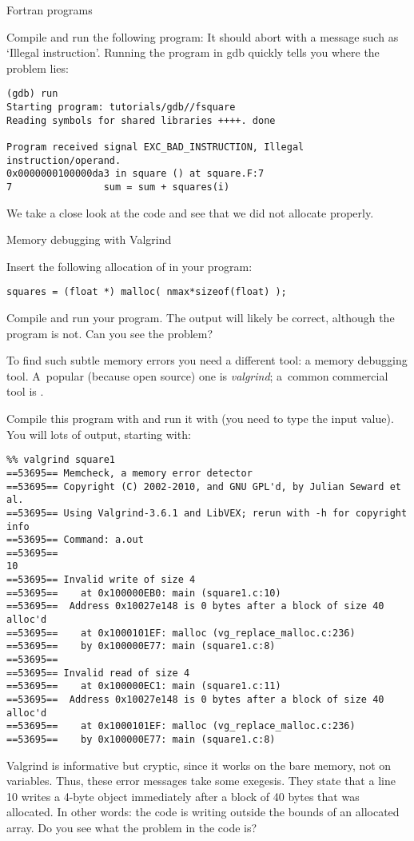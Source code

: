  {Fortran programs}

Compile and run the following program:
It should abort with a message such as `Illegal instruction'.
Running the program in gdb quickly tells you where the problem lies:
\begin{verbatim}
(gdb) run
Starting program: tutorials/gdb//fsquare 
Reading symbols for shared libraries ++++. done

Program received signal EXC_BAD_INSTRUCTION, Illegal instruction/operand.
0x0000000100000da3 in square () at square.F:7
7                sum = sum + squares(i)
\end{verbatim}
We take a close look at the code and see that we did not allocate
 properly.

 {Memory debugging with Valgrind}
\label{sec:valgrind}

Insert the following allocation of  in your program:
\begin{verbatim}
squares = (float *) malloc( nmax*sizeof(float) );
\end{verbatim}
Compile and run your program. The output will likely be correct,
although the program is not. Can you see the problem?


To find such subtle memory errors you need a different tool: a memory
debugging tool. A~popular (because open source) one is
\emph{valgrind}; a~common commercial tool is .

%
Compile this program with  and run it with
 (you need to type the input value). You will lots
of output, starting with:
{\small
\begin{verbatim}
%% valgrind square1
==53695== Memcheck, a memory error detector
==53695== Copyright (C) 2002-2010, and GNU GPL'd, by Julian Seward et al.
==53695== Using Valgrind-3.6.1 and LibVEX; rerun with -h for copyright info
==53695== Command: a.out
==53695== 
10
==53695== Invalid write of size 4
==53695==    at 0x100000EB0: main (square1.c:10)
==53695==  Address 0x10027e148 is 0 bytes after a block of size 40 alloc'd
==53695==    at 0x1000101EF: malloc (vg_replace_malloc.c:236)
==53695==    by 0x100000E77: main (square1.c:8)
==53695== 
==53695== Invalid read of size 4
==53695==    at 0x100000EC1: main (square1.c:11)
==53695==  Address 0x10027e148 is 0 bytes after a block of size 40 alloc'd
==53695==    at 0x1000101EF: malloc (vg_replace_malloc.c:236)
==53695==    by 0x100000E77: main (square1.c:8)
\end{verbatim}
}
Valgrind is informative but cryptic, since it works on the bare
memory, not on variables. Thus, these error messages take some
exegesis. They state that a line 10 writes a 4-byte object immediately
after a block of 40 bytes that was allocated. In other words: the code
is writing outside the bounds of an allocated array. Do you see what
the problem in the code is?

